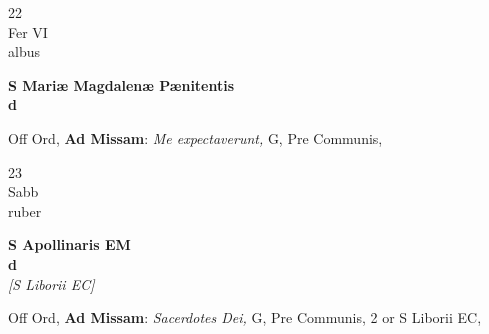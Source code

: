\documentclass[10pt, openany]{book}
\begin{document}
        \begin{center}
            \begin{minipage}{3.5in}
                \vspace{2em}
                \begin{minipage}{0.5in}
                    {\Huge 22} \\
                    {\normalsize Fer VI} \\
                    {\normalsize albus}
                \end{minipage}
                \begin{minipage}{3.0in}
                    \textbf{ \large S Mariæ Magdalenæ Pænitentis \\
                    \textnormal{\normalsize d}} \\ 
                \end{minipage}
                \begin{justify}Off Ord, \textbf{Ad Missam}: \textit{Me expectaverunt,} G, Pre Communis,  
                \end{justify}
            \end{minipage}
        \end{center}
    
        \begin{center}
            \begin{minipage}{3.5in}
                \vspace{2em}
                \begin{minipage}{0.5in}
                    {\Huge 23} \\
                    {\normalsize Sabb} \\
                    {\normalsize ruber}
                \end{minipage}
                \begin{minipage}{3.0in}
                    \textbf{ \large S Apollinaris EM \\
                    \textnormal{\normalsize d}} \\ \textit{[S Liborii EC]} \\ 
                \end{minipage}
                \begin{justify}Off Ord, \textbf{Ad Missam}: \textit{Sacerdotes Dei,} G, Pre Communis, 2 or S Liborii EC,  
                \end{justify}
            \end{minipage}
        \end{center}
    
\end{document}
